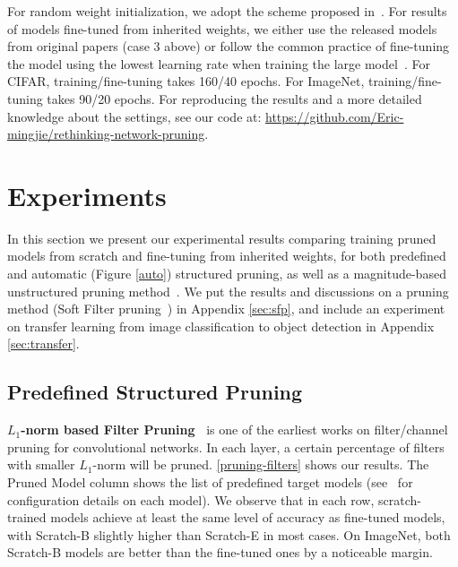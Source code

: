 For random weight initialization, we adopt the scheme proposed in~\cite{he2015delving}. For results of models fine-tuned from inherited weights, we either use the released models from original papers (case 3 above) or follow the common practice of fine-tuning the model using the lowest learning rate when training the large model~\cite{li2016pruning, he2017channel}. For CIFAR, training/fine-tuning takes 160/40 epochs. For ImageNet, training/fine-tuning takes 90/20 epochs. For reproducing the results and a more detailed knowledge about the settings, see our code at: \url{https://github.com/Eric-mingjie/rethinking-network-pruning}.

\section{Experiments}
\label{sec:exp}
In this section we present our experimental results comparing training pruned models from scratch and fine-tuning from inherited weights, for both predefined and automatic (Figure \ref{auto}) structured pruning, as well as a magnitude-based unstructured pruning method~\cite{han2015learning}. We put the results and discussions on a pruning method (Soft Filter pruning~\cite{he2018sfp}) in Appendix \ref{sec:sfp}, and include an experiment on transfer learning from image classification to object detection in Appendix \ref{sec:transfer}.


\subsection{Predefined Structured Pruning}
\textbf{$L_1$-norm based Filter Pruning~\cite{li2016pruning}} is one of the earliest works on filter/channel pruning for convolutional networks. In each layer, a certain percentage of filters with smaller $L_1$-norm will be pruned. 
\autoref{pruning-filters} shows our results. The Pruned Model column shows the list of predefined target models (see~\cite{li2016pruning} for configuration details on each model). We observe that in each row, scratch-trained models achieve at least the same level of accuracy as fine-tuned models, with Scratch-B slightly higher than Scratch-E in most cases. On ImageNet, both Scratch-B models are better than the fine-tuned ones by a noticeable margin. 

